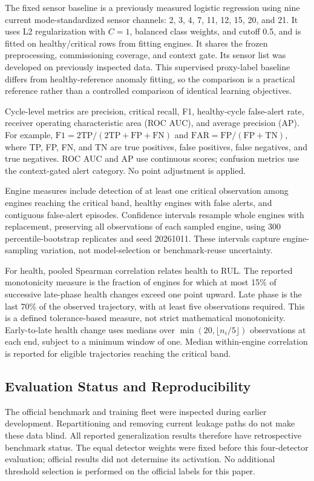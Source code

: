 \documentclass[conference]{IEEEtran}
\begin{document}
The fixed sensor baseline is a previously measured logistic regression using nine current mode-standardized sensor channels: 2, 3, 4, 7, 11, 12, 15, 20, and 21. It uses L2 regularization with $C=1$, balanced class weights, and cutoff 0.5, and is fitted on healthy/critical rows from fitting engines. It shares the frozen preprocessing, commissioning coverage, and context gate. Its sensor list was developed on previously inspected data. This supervised proxy-label baseline differs from healthy-reference anomaly fitting, so the comparison is a practical reference rather than a controlled comparison of identical learning objectives.

Cycle-level metrics are precision, critical recall, F1, healthy-cycle false-alert rate, receiver operating characteristic area (ROC AUC), and average precision (AP). For example, $\mathrm{F1}=2\mathrm{TP}/(2\mathrm{TP}+\mathrm{FP}+\mathrm{FN})$ and $\mathrm{FAR}=\mathrm{FP}/(\mathrm{FP}+\mathrm{TN})$, where TP, FP, FN, and TN are true positives, false positives, false negatives, and true negatives. ROC AUC and AP use continuous scores; confusion metrics use the context-gated alert category. No point adjustment is applied.

Engine measures include detection of at least one critical observation among engines reaching the critical band, healthy engines with false alerts, and contiguous false-alert episodes. Confidence intervals resample whole engines with replacement, preserving all observations of each sampled engine, using 300 percentile-bootstrap replicates and seed 20261011. These intervals capture engine-sampling variation, not model-selection or benchmark-reuse uncertainty.

For health, pooled Spearman correlation relates health to RUL. The reported monotonicity measure is the fraction of engines for which at most 15\% of successive late-phase health changes exceed one point upward. Late phase is the last 70\% of the observed trajectory, with at least five observations required. This is a defined tolerance-based measure, not strict mathematical monotonicity. Early-to-late health change uses medians over $\min(20,\lfloor n_i/5\rfloor)$ observations at each end, subject to a minimum window of one. Median within-engine correlation is reported for eligible trajectories reaching the critical band.

\subsection{Evaluation Status and Reproducibility}
The official benchmark and training fleet were inspected during earlier development. Repartitioning and removing current leakage paths do not make these data blind. All reported generalization results therefore have retrospective benchmark status. The equal detector weights were fixed before this four-detector evaluation; official results did not determine its activation. No additional threshold selection is performed on the official labels for this paper.
\end{document}
